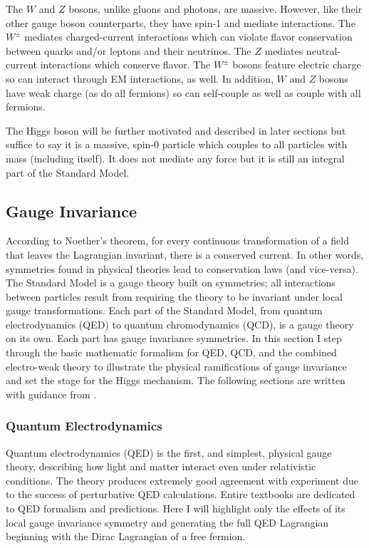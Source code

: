 The $W$ and $Z$ bosons, unlike gluons and photons, are massive. However, like their other gauge boson counterparts, they have spin-1 and mediate interactions. The $W^{\pm}$ mediates charged-current interactions which can violate flavor conservation between quarks and/or leptons and their neutrinos. The $Z$ mediates neutral-current interactions which conserve flavor. The $W^{\pm}$ bosons feature electric charge so can interact through EM interactions, as well. In addition, $W$ and $Z$ bosons have weak charge (as do all fermions) so can self-couple as well as couple with all fermions. 
 
The Higgs boson will be further motivated and described in later sections but suffice to say it is a massive, spin-0 particle which couples to all particles with mass (including itself). It does not mediate any force but it is still an integral part of the Standard Model.  

\subsection{Gauge Invariance}
According to Noether's theorem, for every continuous transformation of a field that leaves the Lagrangian invariant, there is a conserved current. In other words, symmetries found in physical theories lead to conservation laws (and vice-versa). The Standard Model is a gauge theory built on symmetries; all interactions between particles result from requiring the theory to be invariant under local gauge transformations. Each part of the Standard Model, from quantum electrodynamics (QED) to quantum chromodynamics (QCD), is a gauge theory on its own. Each part has gauge invariance symmetries. In this section I step through the basic mathematic formalism for QED, QCD, and the combined electro-weak theory to illustrate the physical ramifications of gauge invariance and set the stage for the Higgs mechanism. The following sections are written with guidance from \cite{HalzenMartin}. 

\subsubsection{Quantum Electrodynamics}
Quantum electrodynamics (QED) is the first, and simplest, physical gauge theory, describing how light and matter interact even under relativistic conditions. The theory produces extremely good agreement with experiment due to the success of perturbative QED calculations. Entire textbooks are dedicated to QED formalism and predictions. Here I will highlight only the effects of its local gauge invariance symmetry and generating the full QED Lagrangian beginning with the Dirac Lagrangian of a free fermion. 


